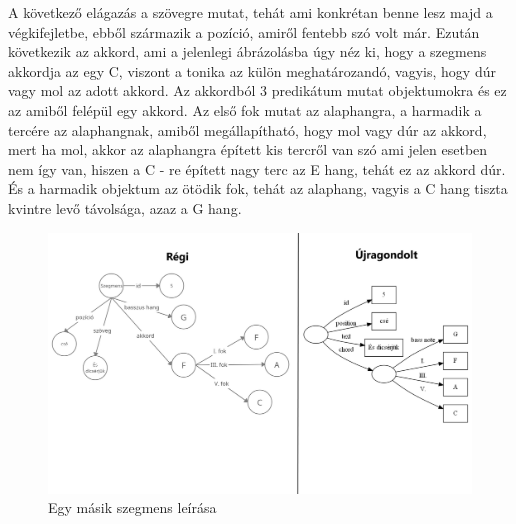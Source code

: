 \par 
A következő elágazás a szövegre mutat, tehát ami konkrétan benne lesz majd a végkifejletbe, ebből származik a pozíció, amiről fentebb szó volt már. Ezután következik az akkord, ami a jelenlegi ábrázolásba úgy néz ki, hogy a szegmens akkordja az egy C, viszont a tonika az külön meghatározandó, vagyis, hogy dúr vagy mol az adott akkord. Az akkordból 3 predikátum mutat objektumokra és ez az amiből felépül egy akkord. Az első fok mutat az alaphangra, a harmadik a tercére az alaphangnak, amiből megállapítható, hogy mol vagy dúr az akkord, mert ha mol, akkor az alaphangra épített kis tercről van szó ami jelen esetben nem így van, hiszen a C - re épített nagy terc az E hang, tehát ez az akkord dúr. És a harmadik objektum az ötödik fok, tehát az alaphang, vagyis a C hang tiszta kvintre levő távolsága, azaz a G hang.\newpage

\begin{figure}[h]
	\includegraphics[scale=0.22]{images/misc/comparison_graph_3.jpg}
	\caption{Egy másik szegmens leírása}
	\label{fig:graph3}
\end{figure}


